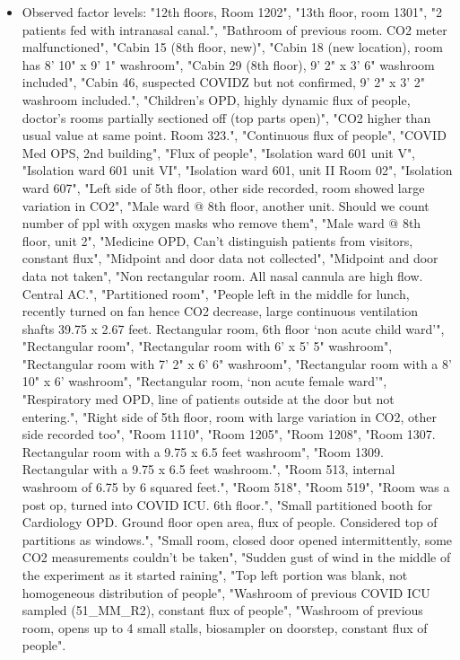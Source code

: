 \documentclass[]{article}
\providecommand{\tightlist}{%
  \setlength{\itemsep}{0pt}\setlength{\parskip}{0pt}}
\begin{document}
\begin{itemize}
\tightlist
\item
  Observed factor levels: "12th floors, Room 1202", "13th floor, room
  1301", "2 patients fed with intranasal canal.", "Bathroom of previous
  room. CO2 meter malfunctioned", "Cabin 15 (8th floor, new)", "Cabin 18
  (new location), room has 8' 10" x 9' 1" washroom", "Cabin 29 (8th
  floor), 9' 2" x 3' 6" washroom included", "Cabin 46, suspected COVIDZ
  but not confirmed, 9' 2" x 3' 2" washroom included.", "Children's OPD,
  highly dynamic flux of people, doctor's rooms partially sectioned off
  (top parts open)", "CO2 higher than usual value at same point. Room
  323.", "Continuous flux of people", "COVID Med OPS, 2nd building",
  "Flux of people", "Isolation ward 601 unit V", "Isolation ward 601
  unit VI", "Isolation ward 601, unit II Room 02", "Isolation ward 607",
  "Left side of 5th floor, other side recorded, room showed large
  variation in CO2", "Male ward @ 8th floor, another unit. Should we
  count number of ppl with oxygen masks who remove them", "Male ward @
  8th floor, unit 2", "Medicine OPD, Can't distinguish patients from
  visitors, constant flux", "Midpoint and door data not collected",
  "Midpoint and door data not taken", "Non rectangular room. All nasal
  cannula are high flow. Central AC.", "Partitioned room", "People left
  in the middle for lunch, recently turned on fan hence CO2 decrease,
  large continuous ventilation shafts 39.75 x 2.67 feet. Rectangular
  room, 6th floor `non acute child ward'", "Rectangular room",
  "Rectangular room with 6' x 5' 5" washroom", "Rectangular room with 7'
  2" x 6' 6" washroom", "Rectangular room with a 8' 10" x 6' washroom",
  "Rectangular room, `non acute female ward'", "Respiratory med OPD,
  line of patients outside at the door but not entering.", "Right side
  of 5th floor, room with large variation in CO2, other side recorded
  too", "Room 1110", "Room 1205", "Room 1208", "Room 1307. Rectangular
  room with a 9.75 x 6.5 feet washroom", "Room 1309. Rectangular with a
  9.75 x 6.5 feet washroom.", "Room 513, internal washroom of 6.75 by 6
  squared feet.", "Room 518", "Room 519", "Room was a post op, turned
  into COVID ICU. 6th floor.", "Small partitioned booth for Cardiology
  OPD. Ground floor open area, flux of people. Considered top of
  partitions as windows.", "Small room, closed door opened
  intermittently, some CO2 measurements couldn't be taken", "Sudden gust
  of wind in the middle of the experiment as it started raining", "Top
  left portion was blank, not homogeneous distribution of people",
  "Washroom of previous COVID ICU sampled (51\_MM\_R2), constant flux of
  people", "Washroom of previous room, opens up to 4 small stalls,
  biosampler on doorstep, constant flux of people".
\end{itemize}
\end{document}
